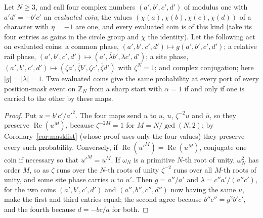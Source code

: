 \begin{corollary}\label{cor:maskorbit}
Let $N\ge3$, and call four complex numbers $(a',b',c',d')$ of modulus one with $a'd'=-b'c'$ an \emph{evaluated coin}; the values $(\chi(a),\chi(b),\chi(c),\chi(d))$ of a character with $\eta=-1$ are one, and every evaluated coin is of this kind (take its four entries as gains in the circle group and $\chi$ the identity). Let the following act on evaluated coins: a common phase, $(a',b',c',d')\mapsto g(a',b',c',d')$; a relative rail phase, $(a',b',c',d')\mapsto(a',\bar\lambda b',\lambda c',d')$; a site phase, $(a',b',c',d')\mapsto(\zeta a',\bar\zeta b',\zeta c',\bar\zeta d')$ with $\zeta^{N}=1$; and complex conjugation; here $|g|=|\lambda|=1$. Two evaluated coins give the same probability at every port of every position-mask event on $\mathbb{Z}_N$ from a sharp start with $\alpha=1$ if and only if one is carried to the other by these maps.
\end{corollary}
\begin{proof}
Put $u=b'c'/a'^{2}$. The four maps send $u$ to $u$, $u$, $\zeta^{-2}u$ and $\bar u$, so they preserve $\operatorname{Re}(u^{M})$, because $\zeta^{-2M}=1$ for $M=N/\gcd(N,2)$; by Corollary~\ref{cor:masklist} (whose proof uses only the four values) they preserve every such probability. Conversely, if $\operatorname{Re}(u'^{M})=\operatorname{Re}(u^{M})$, conjugate one coin if necessary so that $u'^{M}=u^{M}$. If $\omega_N$ is a primitive $N$-th root of unity, $\omega_N^{2}$ has order $M$, so as $\zeta$ runs over the $N$-th roots of unity $\zeta^{-2}$ runs over all $M$-th roots of unity, and some site phase carries $u$ to $u'$. Then $g=a''/a'$ and $\lambda=c''a'/(a''c')$, for the two coins $(a',b',c',d')$ and $(a'',b'',c'',d'')$ now having the same $u$, make the first and third entries equal; the second agree because $b''c''=g^{2}b'c'$, and the fourth because $d=-bc/a$ for both.
\end{proof}

